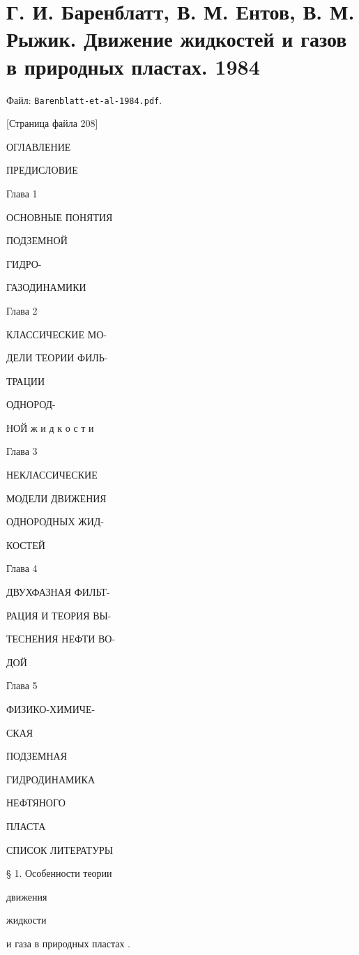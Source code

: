 \documentclass[
  11pt,
]{article}
\begin{document}

\section{Г. И. Баренблатт, В. М. Ентов, В. М. Рыжик. Движение жидкостей и газов в природных пластах. 1984}\label{section-15}

Файл: \texttt{Barenblatt-et-al-1984.pdf}.

\begingroup\small\setlength{\parindent}{0pt}\setlength{\parskip}{1pt}
{[}Страница файла 208{]}\par
ОГЛАВЛЕНИЕ\par
ПРЕДИСЛОВИЕ\par
Глава 1\par
ОСНОВНЫЕ ПОНЯТИЯ\par
ПОДЗЕМНОЙ \par
ГИДРО-\par
ГАЗОДИНАМИКИ\par
Глава 2\par
КЛАССИЧЕСКИЕ МО-\par
ДЕЛИ ТЕОРИИ ФИЛЬ-\par
ТРАЦИИ \par
ОДНОРОД-\par
НОЙ ж и д к о с т и\par
Глава 3\par
НЕКЛАССИЧЕСКИЕ\par
МОДЕЛИ ДВИЖЕНИЯ\par
ОДНОРОДНЫХ ЖИД-\par
КОСТЕЙ\par
Глава 4\par
ДВУХФАЗНАЯ ФИЛЬТ-\par
РАЦИЯ И ТЕОРИЯ ВЫ-\par
ТЕСНЕНИЯ НЕФТИ ВО-\par
ДОЙ\par
Глава 5\par
ФИЗИКО-ХИМИЧЕ-\par
СКАЯ \par
ПОДЗЕМНАЯ\par
ГИДРОДИНАМИКА\par
НЕФТЯНОГО \par
ПЛАСТА\par
СПИСОК ЛИТЕРАТУРЫ\par
§ 1. Особенности теории \par
движения \par
жидкости\par
и газа в природных пластах .\par
\end{document}
